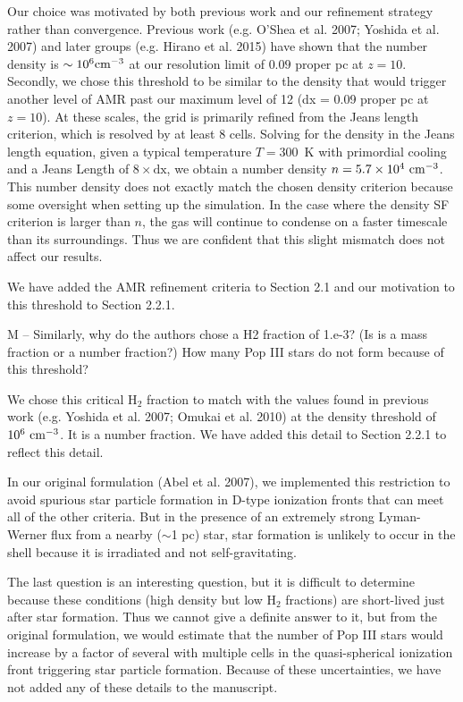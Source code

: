 \documentclass[11pt]{article}
\newenvironment{referee}[1][]{%
    \ignorespaces%
    \begin{mdframed}[style=myquotestyle,#1]%
}{%
    \end{mdframed}%
    \ignorespacesafterend%
}%
\begin{document}
Our choice was motivated by both previous work and our refinement strategy rather than convergence. Previous work (e.g. O'Shea et al. 2007; Yoshida et al. 2007) and later groups (e.g. Hirano et al. 2015) have shown that the number density is $\sim 10^6 \cubecm$ at our resolution limit of $0.09$ proper pc at $z=10$.  Secondly, we chose this threshold to be similar to the density that would trigger another level of AMR past our maximum level of 12 (dx = 0.09 proper pc at $z=10$).  At these scales, the grid is primarily refined from the Jeans length criterion, which is resolved by at least 8 cells.  Solving for the density in the Jeans length equation, given a typical temperature $T=300$~K with primordial cooling and a Jeans Length of $8 \times \textrm{dx}$, we obtain a number density $n = 5.7 \times 10^4~\cubecm$.  This number density does not exactly match the chosen density criterion because some oversight when setting up the simulation.  In the case where the density SF criterion is larger than $n$, the gas will continue to condense on a faster timescale than its surroundings.  Thus we are confident that this slight mismatch does not affect our results.

We have added the AMR refinement criteria to Section 2.1 and our motivation to this threshold to Section 2.2.1.

\begin{referee}
M -- Similarly, why do the authors chose a H2 fraction of 1.e-3? (Is is a mass fraction or a number fraction?) How many Pop III stars do not form because of this threshold?
\end{referee}

We chose this critical H$_2$ fraction to match with the values found in previous work (e.g. Yoshida et al. 2007; Omukai et al. 2010) at the density threshold of $10^6~\cubecm$.  It is a number fraction.  We have added this detail to Section 2.2.1 to reflect this detail.

In our original formulation (Abel et al. 2007), we implemented this restriction to avoid spurious star particle formation in D-type ionization fronts that can meet all of the other criteria.  But in the presence of an extremely strong Lyman-Werner flux from a nearby ($\sim$1 pc) star, star formation is unlikely to occur in the shell because it is irradiated and not self-gravitating.

The last question is an interesting question, but it is difficult to determine because these conditions (high density but low H$_2$ fractions) are short-lived just after star formation.  Thus we cannot give a definite answer to it, but from the original formulation, we would estimate that the number of Pop III stars would increase by a factor of several with multiple cells in the quasi-spherical ionization front triggering star particle formation.  Because of these uncertainties, we have not added any of these details to the manuscript.
\end{document}
